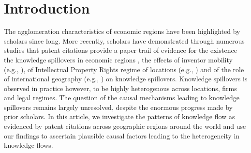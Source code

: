 \documentclass[12pt]{article}
\begin{document}
\section{Introduction}\label{S:Introduction}
The agglomeration characteristics of economic regions have been highlighted by scholars since long\citep{Marshall1890}. More recently, scholars have demonstrated through numerous studies that patent citations provide a paper trail of evidence for the existence the knowledge spillovers in economic regions \citep{Jaffe1993, Almeida1999},  the effects of inventor mobility (e.g., \cite{Almeida1999}), of Intellectual Property Rights regime of locations (e.g., \cite{Zhao2006}) and of the role of international geography (e.g., \cite{Singh2007}) on knowledge spillovers. Knowledge spillovers is observed in practice however, to be highly heterogenous across locations, firms and legal regimes. The question of the causal mechanisms leading to knowledge spillovers remains largely unresolved, despite the enormous progress made by prior scholars. In this article, we investigate the patterns of knowledge flow as evidenced by patent citations across geographic regions around the world and use our findings to ascertain plausible causal factors leading to the heterogeneity in knowledge flows.
\\\\\
\end{document}
